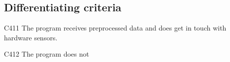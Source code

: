 	
\subsection{Differentiating criteria}
	
	\begin{aims}
		
		\item[C411] The program receives preprocessed data and does get in touch with hardware sensors.
		\item[C412] The program does not %
	
	\end{aims}
	



	
